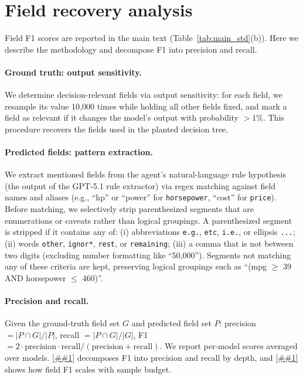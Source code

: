 \documentclass{article} %
\newcommand{\Cref}[1]{\ref{##1}}
\begin{document}
\section{Field recovery analysis}
\label{app:field_f1}

Field F1 scores are reported in the main text (Table~\ref{tab:main_std}(b)).
Here we describe the methodology and decompose F1 into precision and recall.

\paragraph{Ground truth: output sensitivity.}
We determine decision-relevant fields via output sensitivity: for each field, we resample its value 10{,}000 times while holding all other fields fixed, and mark a field as relevant if it changes the model's output with probability ${>}1\%$.
This procedure recovers the fields used in the planted decision tree.

\paragraph{Predicted fields: pattern extraction.}
We extract mentioned fields from the agent's natural-language rule hypothesis (the output of the GPT-5.1 rule extractor) via regex matching against field names and aliases (e.g., ``hp'' or ``power'' for \texttt{horsepower}, ``cost'' for \texttt{price}).
Before matching, we selectively strip parenthesized segments that are enumerations or caveats rather than logical groupings.
A parenthesized segment is stripped if it contains any of:
(i) abbreviations \texttt{e.g.}, \texttt{etc}, \texttt{i.e.}, or ellipsis \texttt{...};
(ii) words \texttt{other}, \texttt{ignor*}, \texttt{rest}, or \texttt{remaining};
(iii) a comma that is not between two digits (excluding number formatting like ``50,000'').
Segments not matching any of these criteria are kept, preserving logical groupings such as ``(mpg $\geq$ 39 AND horsepower $\leq$ 460)''.

\paragraph{Precision and recall.}
Given the ground-truth field set $G$ and predicted field set $P$: precision $= |P \cap G| / |P|$, recall $= |P \cap G| / |G|$, F1 $= 2 \cdot \text{precision} \cdot \text{recall} / (\text{precision} + \text{recall})$.
We report per-model scores averaged over models.
\Cref{tab:field_pr} decomposes F1 into precision and recall by depth, and \Cref{fig:budget_f1} shows how field F1 scales with sample budget.
\end{document}
